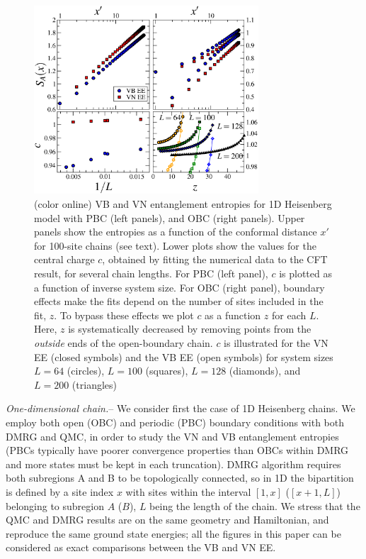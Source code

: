 \documentclass[prl,aps,twocolumn,floatfix,amsmath,amssymb,superscriptaddress,tightenlines]{revtex4}
\begin{document}
\begin{figure} {
\includegraphics[width=3.3in]{4-panelFIG1.eps} \caption{(color online) VB
and VN entanglement entropies for 1D Heisenberg model with PBC (left
panels), and OBC (right panels). Upper panels show the entropies as a
function of the conformal distance $x'$ for 100-site chains (see text).
Lower plots show the values for the central charge $c$, obtained by
fitting the numerical data to the CFT result, for several chain lengths.
For PBC (left panel), $c$ is plotted as a function of inverse system size.
For OBC (right panel), boundary effects make the fits depend on the number
of sites included in the fit, $z$. To bypass these effects we plot $c$ as
a function $z$ for each $L$. Here, $z$ is systematically decreased by
removing points from the {\it outside} ends of the open-boundary chain.
$c$ is illustrated for the VN EE (closed symbols) and the VB EE (open
symbols) for system sizes $L=64$ (circles), $L=100$ (squares), $L=128$
(diamonds), and $L=200$ (triangles) \label{1D}}} \end{figure}

{\it One-dimensional chain.}-- We consider first the case of 1D Heisenberg
chains. We employ both open (OBC) and periodic (PBC) boundary conditions
with both DMRG and QMC, in order to study the VN and VB entanglement
entropies (PBCs typically have poorer convergence properties than OBCs
within DMRG and more states must be kept in each truncation). 
DMRG algorithm requires both subregions A and B to be topologically
connected, so in 1D the bipartition is defined by a site index $x$ with
sites within the interval $[1,x]$ ($[x+1,L]$) belonging to subregion $A$
($B$), $L$ being the length of the chain. We stress that the QMC and DMRG
results are on the same geometry and Hamiltonian, and reproduce the same
ground state energies; all the figures in this paper can be considered as
exact comparisons between the VB and VN EE. 
\end{document}
